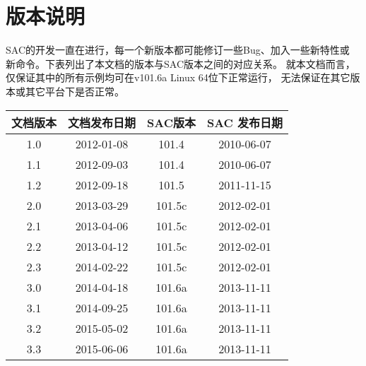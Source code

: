 {\section*{版本说明}}

SAC的开发一直在进行，每一个新版本都可能修订一些Bug、加入一些新特性或
新命令。下表列出了本文档的版本与SAC版本之间的对应关系。
就本文档而言，仅保证其中的所有示例均可在v101.6a Linux 64位下正常运行，
无法保证在其它版本或其它平台下是否正常。

\begin{table}[H]
\centering
\begin{tabular}{cccc}
\toprule
文档版本		& 	文档发布日期 	& 	SAC版本 &	SAC 发布日期\\
\midrule
1.0  			&	2012-01-08		&	101.4	&	2010-06-07	\\
1.1  			&	2012-09-03		&	101.4	&	2010-06-07	\\
1.2  			&	2012-09-18		&	101.5	&	2011-11-15	\\
2.0  			&	2013-03-29		&	101.5c	&	2012-02-01	\\
2.1  			&	2013-04-06		&	101.5c	&	2012-02-01	\\
2.2  			&	2013-04-12		&	101.5c	&	2012-02-01	\\
2.3             &   2014-02-22      &   101.5c  &   2012-02-01  \\
3.0             &   2014-04-18      &   101.6a  &   2013-11-11  \\
3.1             &   2014-09-25      &   101.6a  &   2013-11-11  \\
3.2             &   2015-05-02      &   101.6a  &   2013-11-11  \\
3.3             &   2015-06-06      &   101.6a  &   2013-11-11  \\
\bottomrule
\end{tabular}
\end{table}
